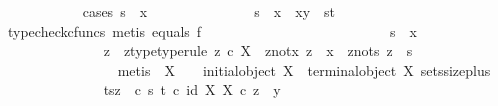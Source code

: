 \begin{isabellebody}
\ \ \ \ \ \ \ \ \ \ \ \isamarkupfalse%
{\isacharparenleft}{\kern0pt}cases\ {\isachardoublequoteopen}s\ {\isacharequal}{\kern0pt}\ x{\isachardoublequoteclose}{\isacharparenright}{\kern0pt}\isanewline
\ \ \ \ \ \ \ \ \ \ \ \ \ \isamarkupfalse%
\ {\isachardoublequoteopen}s\ {\isacharequal}{\kern0pt}\ x\ {\isasymLongrightarrow}\ {\isasymlangle}x{\isacharcomma}{\kern0pt}y{\isasymrangle}\ {\isacharequal}{\kern0pt}\ {\isasymlangle}s{\isacharcomma}{\kern0pt}t{\isasymrangle}{\isachardoublequoteclose}\isanewline
\ \ \ \ \ \ \ \ \ \ \ \ \ \ \ \isamarkupfalse%
\ {\isacharparenleft}{\kern0pt}typecheck{\isacharunderscore}{\kern0pt}cfuncs{\isacharcomma}{\kern0pt}\ metis\ equals{}\ f{}{\isacharparenright}{\kern0pt}\isanewline
\ \ \ \ \ \ \ \ \ \ \ \isamarkupfalse%
\isanewline
\ \ \ \ \ \ \ \ \ \ \ \ \ \isamarkupfalse%
\ {\isachardoublequoteopen}s\ {\isasymnoteq}\ x{\isachardoublequoteclose}\ \ \isanewline
\ \ \ \ \ \ \ \ \ \ \ \ \ \isamarkupfalse%
\ z\ \ z{\isacharunderscore}{\kern0pt}type{\isacharbrackleft}{\kern0pt}type{\isacharunderscore}{\kern0pt}rule{\isacharbrackright}{\kern0pt}{\isacharcolon}{\kern0pt}\ {\isachardoublequoteopen}z\ {\isasymin}\isactrlsub c\ X{\isachardoublequoteclose}\ \ z{\isacharunderscore}{\kern0pt}not{\isacharunderscore}{\kern0pt}x{\isacharcolon}{\kern0pt}\ {\isachardoublequoteopen}z\ {\isasymnoteq}\ x{\isachardoublequoteclose}\ \ z{\isacharunderscore}{\kern0pt}not{\isacharunderscore}{\kern0pt}s{\isacharcolon}{\kern0pt}\ {\isachardoublequoteopen}z\ {\isasymnoteq}\ s{\isachardoublequoteclose}\isanewline
\ \ \ \ \ \ \ \ \ \ \ \ \ \ \ \isamarkupfalse%
\ {\isacharparenleft}{\kern0pt}metis\ {\isacartoucheopen}{\isasymnot}\ X\ {\isasymcong}\ {\isasymOmega}{\isacartoucheclose}\ {\isacartoucheopen}{\isasymnot}\ initial{\isacharunderscore}{\kern0pt}object\ X{\isacartoucheclose}\ {\isacartoucheopen}{\isasymnot}\ terminal{\isacharunderscore}{\kern0pt}object\ X{\isacartoucheclose}\ sets{\isacharunderscore}{\kern0pt}size{\isacharunderscore}{\kern0pt}{}{\isacharunderscore}{\kern0pt}plus{\isacharparenright}{\kern0pt}\isanewline
\ \ \ \ \ \ \ \ \ \ \ \ \ \isamarkupfalse%
\ t{\isacharunderscore}{\kern0pt}sz{\isacharcolon}{\kern0pt}\ {\isachardoublequoteopen}{\isacharparenleft}{\kern0pt}{\isasymTheta}\ {\isasymcirc}\isactrlsub c\ {\isasymlangle}s{\isacharcomma}{\kern0pt}\ t{\isasymrangle}{\isacharparenright}{\kern0pt}\isactrlsup {\isasymflat}\ {\isasymcirc}\isactrlsub c\ {\isasymlangle}id\ X{\isacharcomma}{\kern0pt}\ {\isasymbeta}\isactrlbsub X\isactrlesub {\isasymrangle}\ {\isasymcirc}\isactrlsub c\ z\ {\isacharequal}{\kern0pt}\ y{}{\isachardoublequoteclose}\isanewline

\end{isabellebody}
